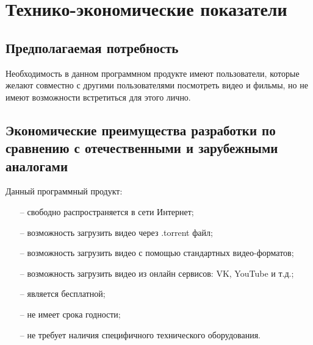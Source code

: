 \section{Технико-экономические показатели}

\subsection{Предполагаемая потребность}

Необходимость в данном программном продукте имеют пользователи, которые желают совместно с другими пользователями
посмотреть видео и фильмы, но не имеют возможности встретиться для этого лично.

\subsection{Экономические преимущества разработки по сравнению с отечественными и зарубежными аналогами}

Данный программный продукт:
\begin{itemize}
    \item[--] свободно распространяется в сети Интернет;
    \item[--] возможность загрузить видео через .torrent файл;
    \item[--] возможность загрузить видео с помощью стандартных видео-форматов;
    \item[--] возможность загрузить видео из онлайн сервисов: VK, YouTube и т.д.;
    \item[--] является бесплатной;
    \item[--] не имеет срока годности;
    \item[--] не требует наличия специфичного технического оборудования.
\end{itemize}